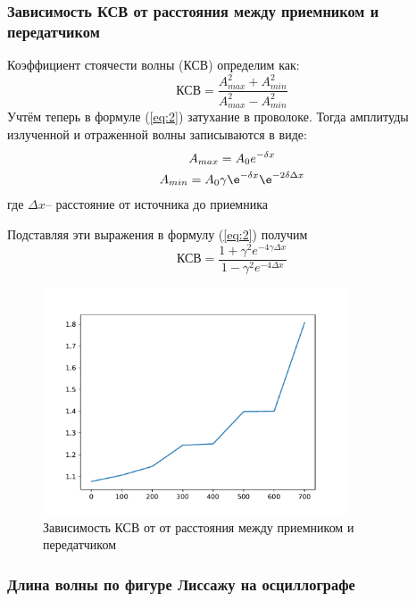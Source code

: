 \subsubsection{Зависимость КСВ от расстояния между приемником и передатчиком}

Коэффициент стоячести волны (КСВ) определим как:
\begin{equation}
	\label{eq:2}
 	\text{КСВ}=\frac{A_{max}^2+A_{min}^2}{A_{max}^2-A_{min}^2} 
\end{equation}
Учтём теперь в формуле (\ref{eq:2}) затухание в проволоке.
Тогда амплитуды излученной и отраженной волны записываются в виде:
\begin{gather*}
	A_{max}=A_0 e^{-\delta x} \\
	A_{min}=A_0\gamma\e^{-\delta x}\e^{-2\delta\Delta x}
\end{gather*}
где $\Delta x$-- расстояние от источника до приемника

Подставляя эти выражения в формулу (\ref{eq:2}) получим
\begin{equation}
	\text{КСВ}=\frac{1+\gamma^2 e^{-4\gamma\Delta x}}
	{1-\gamma^2 e^{-4\Delta x}}
\end{equation}


\begin{figure}[H]
	\centering
	\includegraphics[width=0.8\textwidth]{fig1.pdf}
	\caption{Зависимость КСВ от от расстояния между приемником и передатчиком}
	\label{fig:1}
\end{figure}

\subsubsection{Длина волны по фигуре Лиссажу на осциллографе}


